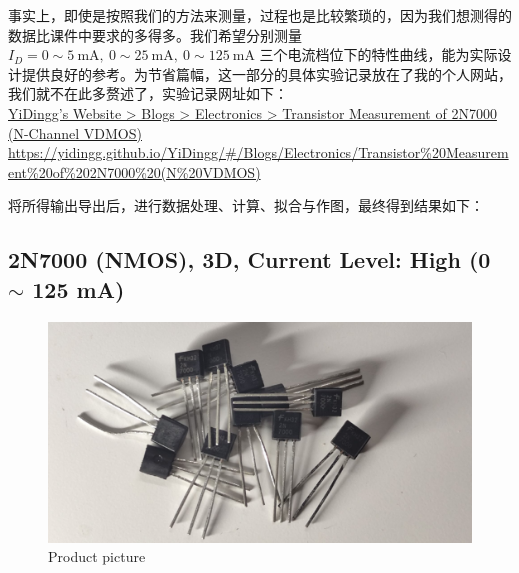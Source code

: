 \documentclass[UTF8]{article}
\begin{document}
事实上，即使是按照我们的方法来测量，过程也是比较繁琐的，因为我们想测得的数据比课件中要求的多得多。我们希望分别测量 $I_D = 0 \sim 5 \ \mathrm{mA},\ 0 \sim 25 \ \mathrm{mA},\ 0 \sim 125 \ \mathrm{mA}$ 三个电流档位下的特性曲线，能为实际设计提供良好的参考。为节省篇幅，这一部分的具体实验记录放在了我的个人网站，我们就不在此多赘述了，实验记录网址如下：\\ 
\href{https://yidingg.github.io/YiDingg/\#/Blogs/Electronics/Transistor\%20Measurement\%20of\%202N7000\%20(N\%20VDMOS)
}{ %
\hspace*{2em} YiDingg's Website > Blogs > Electronics > Transistor Measurement of 2N7000 (N-Channel VDMOS) 
\\ {\color{black}\small \hspace*{2em} https://yidingg.github.io/YiDingg/\#/Blogs/Electronics/Transistor\%20Measurement\%20of\%202N7000\%20(N\%20VDMOS)}
}

将所得输出导出后，进行数据处理、计算、拟合与作图，最终得到结果如下：

\subsection{2N7000 (NMOS), 3D, Current Level: High (0 $\sim$ 125 mA)}

\begin{figure}[H]\centering
    \includegraphics[width=0.6\columnwidth]{LCE-04-场效应管/assets/2N7000 (NMOS) [onsemi, KH32] 3D current high/2N7000.png}
    \caption{Product picture}
\end{figure}
\end{document}
